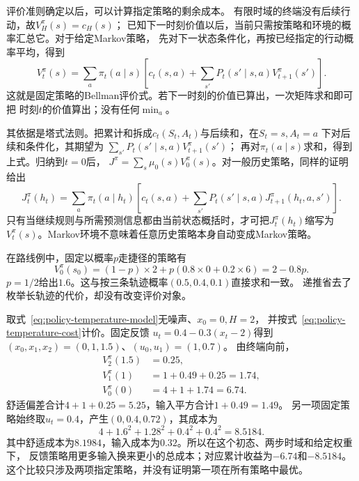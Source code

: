 评价准则确定以后，可以计算指定策略的剩余成本。
有限时域的终端没有后续行动，故$V_H^\pi(s)=c_H(s)$；
已知下一时刻价值以后，当前只需按策略和环境的概率汇总它。对于给定Markov策略，
先对下一状态条件化，再按已经指定的行动概率平均，得到
\begin{equation}
  V_t^\pi(s)=\sum_a\pi_t(a\mid s)
  \left[c_t(s,a)+\sum_{s'}P_t(s'\mid s,a)V_{t+1}^\pi(s')\right].
  \label{eq:decision-policy-bellman}
\end{equation}
这就是固定策略的Bellman评价式。若下一时刻的价值已算出，一次矩阵求和即可把
时刻$t$的价值算出；没有任何$\min_a$。

其依据是塔式法则。把累计和拆成$c_t(S_t,A_t)$与后续和，在$S_t=s,A_t=a$
下对后续和条件化，其期望为
$\sum_{s'}P_t(s'\mid s,a)V_{t+1}^\pi(s')$；
再对$\pi_t(a\mid s)$求和，得到上式。归纳到$t=0$后，
$J^\pi=\sum_s\mu_0(s)V_0^\pi(s)$。对一般历史策略，同样的证明给出
\[
  J_t^\pi(h_t)=\sum_a\pi_t(a\mid h_t)
  \left[c_t(s,a)+\sum_{s'}P_t(s'\mid s,a)
    J_{t+1}^\pi(h_t,a,s')\right].
\]
只有当继续规则与所需预测信息都由当前状态概括时，才可把$J_t^\pi(h_t)$缩写为
$V_t^\pi(s)$。Markov环境不意味着任意历史策略本身自动变成Markov策略。

在路线例中，固定以概率$p$走捷径的策略有
\[
  V_0^\pi(s_0)=(1-p)\times2+p(0.8\times0+0.2\times6)=2-0.8p.
\]
$p=1/2$给出$1.6$。这与按三条轨迹概率$(0.5,0.4,0.1)$直接求和一致。
递推省去了枚举长轨迹的代价，却没有改变评价对象。

\begin{example}[温度策略的两步成本]
\label{ex:policy-temperature-evaluation}
取式~\eqref{eq:policy-temperature-model}无噪声、$x_0=0,H=2$，
并按式~\eqref{eq:policy-temperature-cost}计价。固定反馈
$u_t=0.4-0.3(x_t-2)$得到
$(x_0,x_1,x_2)=(0,1,1.5)$、$(u_0,u_1)=(1,0.7)$。
由终端向前，
\begin{align*}
  V_2^\pi(1.5)&=0.25,\\
  V_1^\pi(1)&=1+0.49+0.25=1.74,\\
  V_0^\pi(0)&=4+1+1.74=6.74.
\end{align*}
舒适偏差合计$4+1+0.25=5.25$，输入平方合计$1+0.49=1.49$。
另一项固定策略始终取$u_t=0.4$，产生$(0,0.4,0.72)$，其成本为
\[
  4+1.6^2+1.28^2+0.4^2+0.4^2=8.5184.
\]
其中舒适成本为$8.1984$，输入成本为$0.32$。所以在这个初态、两步时域和给定权重下，
反馈策略用更多输入换来更小的总成本；对应累计收益为$-6.74$和$-8.5184$。
这个比较只涉及两项指定策略，并没有证明第一项在所有策略中最优。
\end{example}

